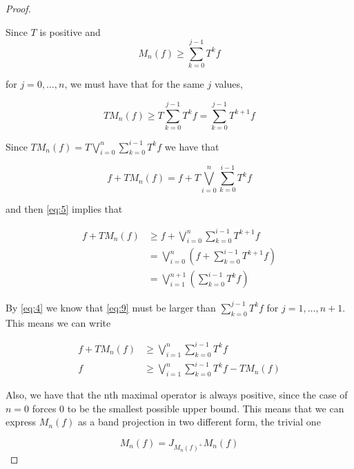 \documentclass[letterpaper,10pt,oneside,onecolumn,reqno]{amsart}
\theoremstyle{definition}
\begin{document}
\begin{proof}
  \label{prf:max-erg}

  Since $T$ is positive and
  \begin{equation}
    \label{eq:4}
    M_n(f) \geq \sum\limits_{k=0}^{j-1} T^kf
  \end{equation}

  for $j = 0,\dots,n$, we must have that for the same $j$ values,

  \begin{equation}
    \label{eq:5}
    TM_n(f) \geq T\sum\limits_{k=0}^{j-1} T^kf = \sum\limits_{k=0}^{j-1} T^{k+1}f
  \end{equation}

  Since $TM_n(f) = T\bigvee_{i=0}^n\sum\limits_{k=0}^{i-1} T^kf$ we
  have that

  \begin{equation}
    \label{eq:6}
    f + TM_n(f) = f + T\bigvee_{i=0}^n\sum\limits_{k=0}^{i-1} T^kf 
  \end{equation}

  and then \eqref{eq:5} implies that

  \begin{align}
    \label{eq:7}
    f + TM_n(f) &\geq f + \bigvee_{i=0}^n\sum\limits_{k=0}^{i-1} T^{k+1}f  \\
    \label{eq:8}
    &= \bigvee_{i=0}^n( f + \sum\limits_{k=0}^{i-1} T^{k+1}f)  \\
    \label{eq:9}
    &= \bigvee_{i=1}^{n+1}( \sum\limits_{k=0}^{i-1} T^{k}f)
  \end{align}

  By \eqref{eq:4} we know that \eqref{eq:9} must be larger than
  $\sum\limits_{k=0}^{j-1} T^{k}f$ for $j = 1,\dots,n+1$. This means
  we can write

  \begin{align}
    \label{eq:10}
    f + TM_n(f) &\geq \bigvee_{i=1}^{n}\sum\limits_{k=0}^{i-1} T^{k}f  \\
    \label{eq:11}
    f &\geq \bigvee_{i=1}^{n}\sum\limits_{k=0}^{i-1} T^{k}f - TM_n(f)
  \end{align}


  Also, we have that the nth maximal operator is always positive,
  since the case of $n=0$ forces $0$ to be the smallest possible upper
  bound. This means that we can express $M_n(f)$ as a band projection
  in two different form, the trivial one

  \begin{equation}
    \label{eq:12}
    M_n(f) = J_{M_n(f)^+}M_n(f) 
  \end{equation}


\end{proof}
\end{document}

